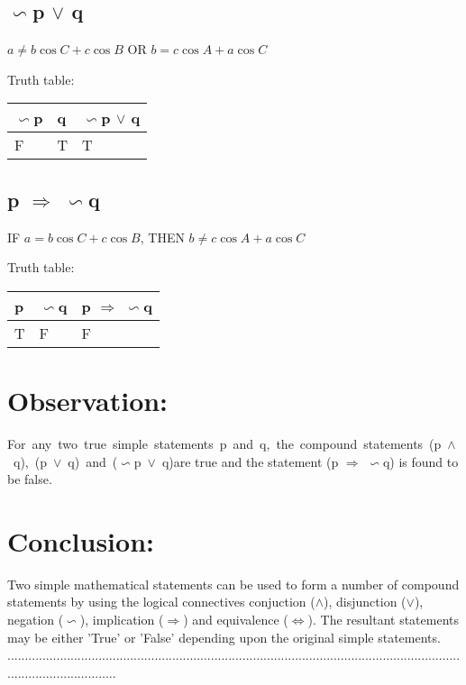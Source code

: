 \documentclass[11pt]{article}
\begin{document}
\subsection{$\backsim$p $\vee$ q}
$a\neq b\cos C+c \cos B$ OR $b=c \cos A+a \cos C$


Truth table:\\
\begin{center}
\begin{tabular}{ |p{2.2cm}||p{1.9cm}||p{3.3cm}|  }
 \hline
 $\backsim$p & q & $\backsim$p $\vee$ q\\
 \hline
 F & T & T \\
 \hline
\end{tabular}
\end{center} 
\subsection{p $\Rightarrow$ $\backsim$q}
IF $a=b\cos C+c \cos B$, THEN $b \neq c\cos A +a \cos C$


Truth table:\\
\begin{center}
\begin{tabular}{ |p{2.2cm}||p{1.9cm}||p{3.3cm}|  }
 \hline
 p & $\backsim$q & p $\Rightarrow$ $\backsim$q\\
 \hline
 T & F & F \\
 \hline
\end{tabular}
\end{center} 



\section{Observation:}
\mbox{For any two true simple statements p and q, the compound statements (p $\wedge$ q), (p $\vee$ q) and ($\backsim$p $\vee$ q)}are true and the statement (p $\Rightarrow$ $\backsim$q) is found to be false.
    
\section{Conclusion:}
Two simple mathematical statements can be used to form a number of compound statements by using the logical connectives conjuction ($\wedge$), disjunction ($\vee$), negation ($\backsim$), implication ($\Rightarrow$) and equivalence ($\Leftrightarrow$). The resultant statements may be either 'True' or 'False' depending upon the original simple statements.\\[7cm]
\hspace{-1cm}
................................................................................................................................................................




\end{document}
